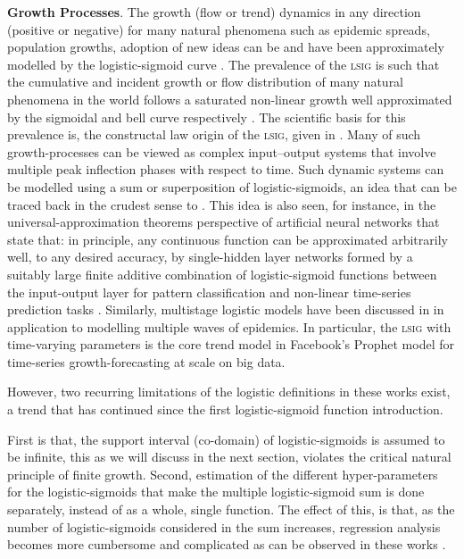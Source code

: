 \documentclass[journal]{IEEEtran}
\theoremstyle{plain}
\theoremstyle{definition}
\theoremstyle{remark}
\begin{document}
\textbf{Growth Processes}. The growth (flow or trend) dynamics in any direction (positive or negative) for many natural phenomena such as epidemic spreads, population growths, adoption of new ideas can be and have been approximately modelled by the logistic-sigmoid curve \cite{taylorForecastingScale2018}. The prevalence of the \textsc{lsig} is such that the cumulative and incident growth or flow distribution of many natural phenomena in the world follows a saturated non-linear growth well approximated by the sigmoidal and bell curve respectively \cite{yinFlexibleSigmoidFunction2003}. The scientific basis for this prevalence is, the constructal law origin of the \textsc{lsig}, given in \cite{bejanConstructalLawOrigin2011}. Many of such growth-processes can be viewed as complex input--output systems that involve multiple peak inflection phases with respect to time. Such dynamic systems can be modelled using a sum or superposition of logistic-sigmoids, an idea that can be traced back in the crudest sense to \cite{reedSummationLogisticCurves1927}. This idea is also seen, for instance, in the universal-approximation theorems perspective of artificial neural networks that state that: in principle, any continuous function can be approximated arbitrarily well, to any desired accuracy, by single-hidden layer networks formed by a suitably large finite additive combination of logistic-sigmoid functions between the input-output layer for pattern classification and non-linear time-series prediction tasks \cite{cybenkoApproximationSuperpositionsSigmoidal1989,hanInfluenceSigmoidFunction1995,udellMaximizingSumSigmoids2013}. Similarly, multistage logistic models have been discussed in \cite{barkerLogisticFunctionComplementary2020,batistaEstimationStateCorona2020,hsiehRealtimeForecastMultiphase2006,chowellNovelSubepidemicModeling2019,lipovetsky_double_2010} in application to modelling multiple waves of epidemics. In particular, the \textsc{lsig} with time-varying parameters is the core trend model in Facebook's Prophet model for time-series growth-forecasting at scale \cite{taylorForecastingScale2018} on big data.

However, two recurring limitations of the logistic definitions in these works exist, a trend that has continued since the first logistic-sigmoid function introduction.

First is that, the support interval (co-domain) of logistic-sigmoids is assumed to be infinite, this as we will discuss in the next section, violates the critical natural principle of finite growth. Second, estimation of the different hyper-parameters for the logistic-sigmoids that make the multiple logistic-sigmoid sum is done separately, instead of as a whole, single function. The effect of this, is that, as the number of logistic-sigmoids considered in the sum increases, regression analysis becomes more cumbersome and complicated as can be observed in these works \cite{leeEstimationCOVID19Spread2020, batistaEstimationStateCorona2020,hsiehRealtimeForecastMultiphase2006,wuGeneralizedLogisticGrowth2020,chowellNovelSubepidemicModeling2019,taylorForecastingScale2018}.
\end{document}
